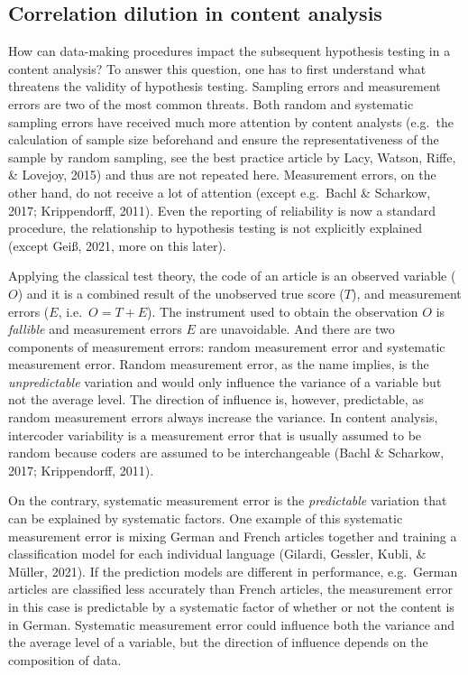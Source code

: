 \documentclass[english,man,floatsintext]{apa6}
\begin{document}
\hypertarget{correlation-dilution-in-content-analysis}{%
\subsection{Correlation dilution in content analysis}\label{correlation-dilution-in-content-analysis}}

How can data-making procedures impact the subsequent hypothesis testing in a content analysis? To answer this question, one has to first understand what threatens the validity of hypothesis testing. Sampling errors and measurement errors are two of the most common threats. Both random and systematic sampling errors have received much more attention by content analysts (e.g.~the calculation of sample size beforehand and ensure the representativeness of the sample by random sampling, see the best practice article by Lacy, Watson, Riffe, \& Lovejoy, 2015) and thus are not repeated here. Measurement errors, on the other hand, do not receive a lot of attention (except e.g.~Bachl \& Scharkow, 2017; Krippendorff, 2011). Even the reporting of reliability is now a standard procedure, the relationship to hypothesis testing is not explicitly explained (except Geiß, 2021, more on this later).

Applying the classical test theory, the code of an article is an observed variable (\(O\)) and it is a combined result of the unobserved true score (\(T\)), and measurement errors (\(E\), i.e.~\(O = T + E\)). The instrument used to obtain the observation \(O\) is \emph{fallible} and measurement errors \(E\) are unavoidable. And there are two components of measurement errors: random measurement error and systematic measurement error. Random measurement error, as the name implies, is the \emph{unpredictable} variation and would only influence the variance of a variable but not the average level. The direction of influence is, however, predictable, as random measurement errors always increase the variance. In content analysis, intercoder variability is a measurement error that is usually assumed to be random because coders are assumed to be interchangeable (Bachl \& Scharkow, 2017; Krippendorff, 2011).

On the contrary, systematic measurement error is the \emph{predictable} variation that can be explained by systematic factors. One example of this systematic measurement error is mixing German and French articles together and training a classification model for each individual language (Gilardi, Gessler, Kubli, \& Müller, 2021). If the prediction models are different in performance, e.g.~German articles are classified less accurately than French articles, the measurement error in this case is predictable by a systematic factor of whether or not the content is in German. Systematic measurement error could influence both the variance and the average level of a variable, but the direction of influence depends on the composition of data.
\end{document}
